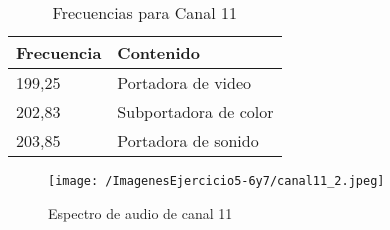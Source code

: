 \begin{table}[H]
\centering
\begin{tabular}{|l|l|}
\hline
Frecuencia & Contenido             \\ \hline
199,25     & Portadora de video    \\ \hline
202,83     & Subportadora de color \\ \hline
203,85     & Portadora de sonido   \\ \hline
\end{tabular}
\caption{Frecuencias para Canal 11}
\label{tab:ch}
\end{table}

\begin{figure}[H]
	\centering
	\texttt{[image: /ImagenesEjercicio5-6y7/canal11\_2.jpeg]}
	\caption{Espectro de audio de canal 11}	
	\label{fig:canal11}
\end{figure}

